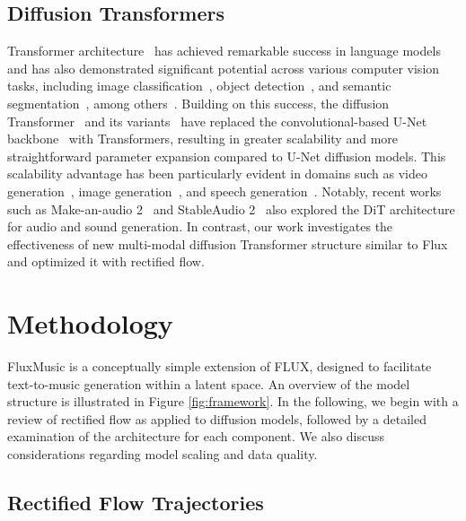 \subsection{Diffusion Transformers}

Transformer architecture~\cite{vaswani2017attention} has achieved remarkable success in language models~\cite{radford2018improving,radford2019language,raffel2020exploring} and has also demonstrated significant potential across various computer vision tasks, including image classification~\cite{dosovitskiy2020image,he2022masked,touvron2021training,zhou2021deepvit,yuan2021tokens,han2021transformer}, object detection~\citep{liu2021swin,wang2021pyramid,wang2022pvt, carion2020end}, and semantic segmentation~\citep{zheng2021rethinking,xie2021segformer,strudel2021segmenter}, among others~\citep{sun2020transtrack,li2022panoptic,zhao2021point,liu2022video,he2022masked,li2022bevformer}. Building on this success, the diffusion Transformer~\cite{Peebles_2023,fei2024moe} and its variants~\cite{bao2023all,fei2024scalable} have replaced the convolutional-based U-Net backbone~\cite{ronneberger2015u} with Transformers, resulting in greater scalability and more straightforward parameter expansion compared to U-Net diffusion models. This scalability advantage has been particularly evident in domains such as video generation~\cite{ma2024latte}, image generation~\cite{chen2023pixart}, and speech generation~\cite{liu2023vit}. Notably, recent works such as Make-an-audio 2~\cite{huang2023make,huang2023make2} and StableAudio 2~\cite{evans2024stable} also explored the DiT architecture for audio and sound generation. In contrast, our work investigates the effectiveness of new multi-modal diffusion Transformer structure similar to Flux and optimized it with rectified flow.

\section{Methodology}

FluxMusic is a conceptually simple extension of FLUX, designed to facilitate text-to-music generation within a latent space. An overview of the model structure is illustrated in Figure \ref{fig:framework}. In the following, we begin with a review of rectified flow as applied to diffusion models, followed by a detailed examination of the architecture for each component. We also discuss considerations regarding model scaling and data quality.

\subsection{Rectified Flow Trajectories}

